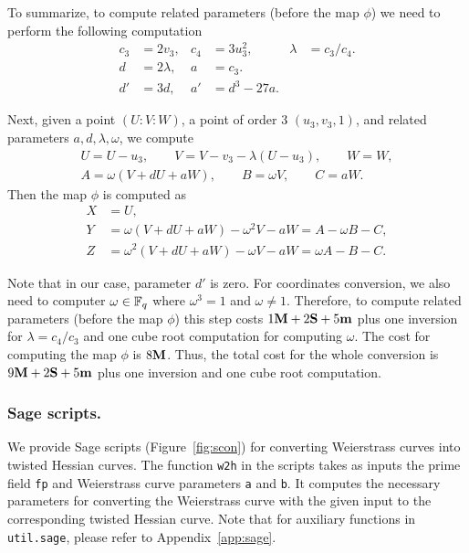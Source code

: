 To summarize, to compute related parameters (before the map $\phi$)
we need to perform the following computation
\begin{align*}
c_3 &= 2 v_3,	&	c_4 &= 3 u_3^2,		&	\lambda &= c_3 / c_4.	\\
d &= 2 \lambda,	&	a &= c_3.		&	\\
d' &= 3 d,	&	a' &= d^3 - 27 a.	&
\end{align*}

Next,
given a point $(U:V:W)$, a point of order 3 $(u_3,v_3,1)$, and related parameters
$a,d,\lambda,\omega$,
we compute
\begin{gather*}
U = U - u_3, \qquad
V = V - v_3 - \lambda (U - u_3), \qquad
W = W, \\
A = \omega(V + dU + aW),	\qquad
B = \omega V,	\qquad
C = aW.
\end{gather*}
Then the map $\phi$ is computed as
\begin{align*}
X &= U,	\\
Y &= \omega(V + dU + aW) - \omega^2V - aW = A - \omega B - C,	\\
Z &= \omega^2(V + dU + aW) - \omega V - aW = \omega A - B - C.
\end{align*}

Note that in our case, parameter $d'$ is zero.
For coordinates conversion, we also need to computer $\omega \in \mathbb{F}_{q}$
where $\omega^3 = 1$ and $\omega \ne 1$.
Therefore, to compute related parameters (before the map $\phi$)
this step costs $1\textbf{M} + 2\textbf{S} + 5\textbf{m}$
plus one inversion for $\lambda = c_4 / c_3$
and one cube root computation for computing $\omega$.
The cost for computing the map $\phi$ is $8\textbf{M}$.
Thus, the total cost for the whole conversion is $9\textbf{M} + 2\textbf{S} + 5\textbf{m}$
plus one inversion and one cube root computation.


\subsubsection{Sage scripts.}
We provide Sage scripts (Figure~\ref{fig:scon})
for converting Weierstrass curves into twisted Hessian curves.
The function \texttt{w2h} in the scripts takes as inputs
the prime field \texttt{fp} and
Weierstrass curve parameters \texttt{a} and \texttt{b}.
It computes the necessary parameters for converting the Weierstrass curve
with the given input to the corresponding twisted Hessian curve.
Note that for auxiliary functions in \texttt{util.sage}, please refer to Appendix~\ref{app:sage}.

